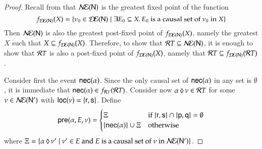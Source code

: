 \begin{proof}
Recall from  that 
$\mathcal{N\!E}({\sf N})$ is the greatest fixed point of the function
\[
f_{\mathcal{D\!E}({\sf N})}(X) = \{\nu_0\in \mathcal{D\!E}({\sf N}) \mid
    \exists E_0 \subseteq X. \, E_0 ~\text{is a causal set of }
    \nu_0 \text{ in } X\}
    \]
Then $\mathcal{N\!E}({\sf N})$ is also the greatest post-fixed point of
$f_{\mathcal{D\!E}({\sf N})}(X)$, namely the greatest $X$ such that $X\subseteq
f_{\mathcal{D\!E}({\sf N})}(X)$.
Therefore, to show that ${\mathcal RT} \subseteq \mathcal{N\!E}({\sf N})$, it is enough to
show that ${\mathcal RT}$ is also a post-fixed point of
$f_{\mathcal{D\!E}({\sf N})}(X)$, namely that ${\mathcal RT} \subseteq f_{\mathcal{D\!E}({\sf N})}({\mathcal RT})$.  


Consider first the event ${\sf nec}(\alpha)$. Since the only 
causal set of ${\sf nec}(\alpha)$ in any set is $\emptyset$,
it is immediate that ${\sf nec}(\alpha)\in f_{{\mathcal RT}}({\mathcal RT})$. 
Consider now ${\alpha}\,\lozenge\,{\nu} \in {\mathcal RT}$ for some $\nu\in \mathcal{N\!E}({\sf N}')$  with ${\sf loc}(\nu)=\{{\sf r},{\sf s}\}$.  Define
\[
{\sf pre}(\alpha,E,\nu)= \begin{cases}
    \Xi    & \text{if }\{{\sf r},{\sf s}\} \cap \{{\sf p},{\sf q}\} = \emptyset\\
    \{{\sf nec}(\alpha)\}\cup\Xi & \text{otherwise}
\end{cases}
\]
where $\Xi=
\{{\alpha}\,\lozenge\,{\nu'}\mid\nu'
  \in E\text{ and $E$ is a causal set of $\nu$ in $\mathcal{N\!E}({\sf N}')$}\}$. 


\end{proof}
